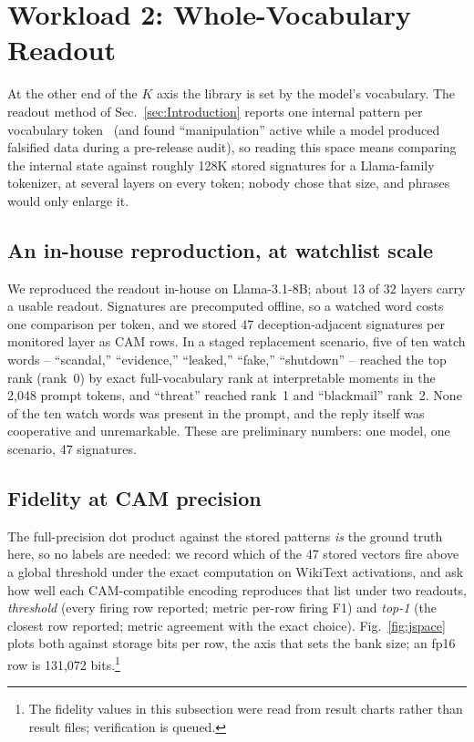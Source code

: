 \documentclass[conference]{IEEEtran}
\newcommand{\cam}{{CAM}\xspace}
\begin{document}
\section{Workload 2: Whole-Vocabulary Readout}
\label{sec:LargeK}
\label{subsec:Jspace}
At the other end of the $K$ axis the library is set by the model's
vocabulary. The readout method of Sec.~\ref{sec:Introduction}
reports one internal pattern per vocabulary
token~\cite{anthropic2026workspace} (and found ``manipulation''
active while a model produced falsified data during a pre-release
audit), so
reading this space means comparing the internal state against
roughly 128K stored signatures for a Llama-family tokenizer, at
several layers on every token; nobody chose that size, and phrases
would only enlarge it.

\subsection{An in-house reproduction, at watchlist scale}
\label{subsec:Watchlist}
We reproduced the readout in-house on Llama-3.1-8B; about 13 of 32
layers carry a usable readout. Signatures are
precomputed offline, so a watched word costs one comparison per
token, and we stored 47 deception-adjacent signatures per monitored
layer as \cam rows. In a staged replacement scenario, five of ten
watch words -- ``scandal,'' ``evidence,'' ``leaked,'' ``fake,''
``shutdown'' -- reached the top rank (rank~0) by exact
full-vocabulary rank at interpretable moments in the 2{,}048 prompt
tokens, and ``threat'' reached rank~1 and ``blackmail'' rank~2. None
of the ten watch words was present in the prompt, and the reply
itself was cooperative and unremarkable. These are preliminary numbers: one
model, one scenario, 47 signatures.

\subsection{Fidelity at \cam precision}
\label{subsec:JspaceFidelity}
The full-precision dot product against the stored patterns \emph{is}
the ground truth here, so no labels are needed: we record which of
the 47 stored vectors fire above a global threshold under the exact
computation on WikiText activations, and ask how well each
\cam-compatible encoding reproduces that list under two readouts,
\emph{threshold} (every firing row reported; metric per-row firing
F1) and \emph{top-1} (the closest row reported; metric agreement with
the exact choice). Fig.~\ref{fig:jspace} plots both against storage
bits per row, the axis that sets the bank size; an fp16 row is
131{,}072 bits.\footnote{The fidelity values in this subsection were
read from result charts rather than result files; verification is
queued.}
\end{document}
